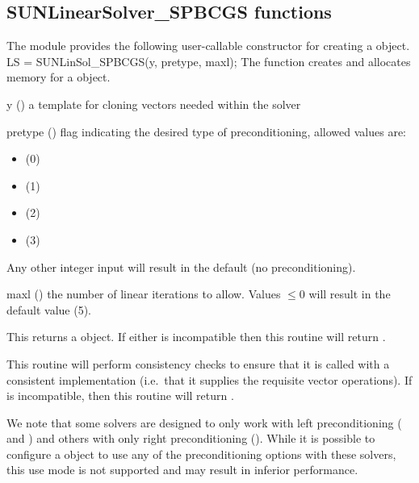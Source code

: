 \subsection{SUNLinearSolver\_SPBCGS functions}
\label{ss:sunlinsol_spbcgs_functions}

The {\sunlinsolspbcgs} module provides the following user-callable constructor
for creating a \newline {} object.
%
%
{
  LS = SUNLinSol\_SPBCGS(y, pretype, maxl);
}
{
  The function  creates and allocates memory for
  a {\spbcgs} \newline {} object.
}
{
  \begin{args}[pretype]
  \item[y] ()
    a template for cloning vectors needed within the solver
  \item[pretype] ()
    flag indicating the desired type of preconditioning, allowed
    values are:
    \begin{itemize}
    \item {} (0)
    \item {} (1)
    \item {} (2)
    \item {} (3)
    \end{itemize}
    Any other integer input will result in the default (no
    preconditioning).
  \item[maxl] ()
    the number of linear iterations to allow. Values $\le0$ will
    result in the default value (5).
  \end{args}
}
{
  This returns a  object.  If either  is
  incompatible then this routine will return .
}
{
  This routine will perform consistency checks to ensure that it is
  called with a consistent {\nvector} implementation (i.e.~that it
  supplies the requisite vector operations).  If  is
  incompatible, then this routine will return .

  We note that some {\sundials} solvers are designed to only work
  with left preconditioning ({\ida} and {\idas}) and others with only
  right preconditioning ({\kinsol}). While it is possible to configure
  a {\sunlinsolspbcgs} object to use any of the preconditioning options
  with these solvers, this use mode is not supported and may result in
  inferior performance.
}
